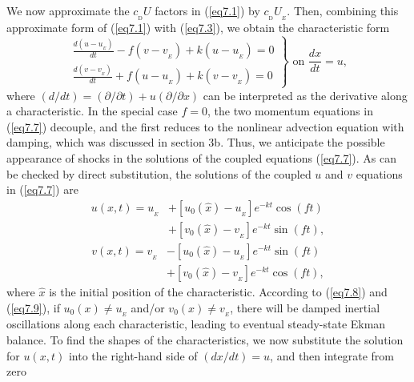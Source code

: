 \documentclass[10pt]{article}
\newcommand{\cD}{c_{_\mathrm{D}}}
\begin{document}
    We now approximate the $\cD U$ factors in (\ref{eq7.1}) by $\cD U_{_E}$. Then,
combining this approximate form of (\ref{eq7.1}) with (\ref{eq7.3}), we obtain
the characteristic form
\begin{equation}                                  %
     \left.\begin{matrix}
                \displaystyle{\frac{d(u-u_{_E})}{dt} - f(v-v_{_E}) + k(u-u_{_E}) = 0} \\[1.5ex]
                \displaystyle{\frac{d(v-v_{_E})}{dt} + f(u-u_{_E}) + k(v-v_{_E}) = 0}
	   \end{matrix}\right\} \,\, \text{on} \,\, \frac{dx}{dt} = u,
\label{eq7.7}
\end{equation}
where $(d/dt)=(\partial/\partial t)+u(\partial/\partial x)$ can be interpreted as
the derivative along a characteristic. In the special case $f=0$, the two momentum
equations in (\ref{eq7.7}) decouple, and the first reduces to the nonlinear advection
equation with damping, which was discussed in section 3b.
Thus, we anticipate the possible appearance of shocks in the solutions of the coupled
equations (\ref{eq7.7}). As can be checked by direct substitution, the solutions
of the coupled $u$ and $v$ equations in (\ref{eq7.7}) are
\begin{equation}                                  %
  \begin{split}
       u(x,t) = u_{_E} &+ [u_0(\hat{x})-u_{_E}]e^{-kt}\cos(ft)  \\
                       &+ [v_0(\hat{x})-v_{_E}]e^{-kt}\sin(ft),
  \end{split}
\label{eq7.8}
\end{equation}
\begin{equation}                                  %
  \begin{split}
       v(x,t) = v_{_E} &- [u_0(\hat{x})-u_{_E}]e^{-kt}\sin(ft)  \\
                       &+ [v_0(\hat{x})-v_{_E}]e^{-kt}\cos(ft),
  \end{split}
\label{eq7.9}
\end{equation}
where $\hat{x}$ is the initial position of the characteristic.
According to (\ref{eq7.8}) and (\ref{eq7.9}), if $u_0(x) \ne u_{_E}$ and/or
$v_0(x) \ne v_{_E}$, there will be damped inertial oscillations along each
characteristic, leading to eventual steady-state Ekman balance.
To find the shapes of the characteristics, we now substitute the solution for
$u(x,t)$ into the right-hand side of $(dx/dt)=u$, and then integrate from zero
\end{document}
